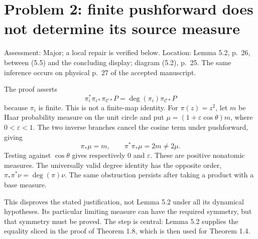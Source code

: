 \documentclass[10pt]{article}
\begin{document}
\section*{Problem 2: finite pushforward does not determine its source measure}
Assessment: Major; a local repair is verified below. Location: Lemma 5.2, p. 26, between (5.5) and the concluding display; diagram (5.2), p. 25. The same inference occurs on physical p. 27 of the accepted manuscript.\par
The proof asserts \[\pi_i^*\pi_{i*}\pi_{\mathcal C*}P
   =\deg(\pi_i)\pi_{\mathcal C*}P\] because \(\pi_i\) is finite. This is not a finite-map identity. For \(\pi(z)=z^2\), let \(m\) be Haar probability measure on the unit circle and put \(\mu=(1+\varepsilon\cos\theta)m\), where \(0<\varepsilon<1\). The two inverse branches cancel the cosine term under pushforward, giving \[\pi_*\mu=m,\qquad \pi^*\pi_*\mu=2m\ne2\mu.\] Testing against \(\cos\theta\) gives respectively \(0\) and \(\varepsilon\). These are positive nonatomic measures. The universally valid degree identity has the opposite order, \(\pi_*\pi^*\nu=\deg(\pi)\nu\). The same obstruction persists after taking a product with a base measure.\par
This disproves the stated justification, not Lemma 5.2 under all its dynamical hypotheses. Its particular limiting measure can have the required symmetry, but that symmetry must be proved. The step is central: Lemma 5.2 supplies the equality sliced in the proof of Theorem 1.8, which is then used for Theorem 1.4.\par
\end{document}
